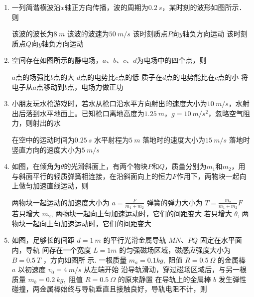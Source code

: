 \begin{enumerate}
\item
一列简谐横波沿$ x $轴正方向传播，波的周期为$ 0.2 \ s $，某时刻的波形如图所示．则  
\begin{figure}[h!]
\centering

\end{figure}

\fourchoices
{该波的波长为$ 8 \ m $}
{该波的波速为$ 50 \ m /s $}
{该时刻质点$ P $向$ y $轴负方向运动}
{该时刻质点$ Q $向$ y $轴负方向运动}


\item 
空间存在如图所示的静电场，$ a $、$ b $、$ c $、$ d $为电场中的四个点，则  
\begin{figure}[h!]
\centering

\end{figure}

\fourchoices
{$ a $点的场强比$ b $点的大}
{$ d $点的电势比$ c $点的低}
{质子在$ d $点的电势能比在$ c $点的小}
{将电子从$ a $点移动到$ b $点，电场力做正功}




\item
小朋友玩水枪游戏时，若水从枪口沿水平方向射出的速度大小为$ 10 \ m /s $，水射出后落到水平地面上。已知枪口离地高度为$ 1.25 \ m $，$ g=10 \ m /s^{2} $，忽略空气阻力，则射出的水  

\fourchoices
{在空中的运动时间为$ 0.25 \ s $}
{水平射程为$ 5 \ m $}
{落地时的速度大小为$ 15 \ m /s $}
{落地时竖直方向的速度大小为$ 5 \ m /s $}




\item
如图，在倾角为$ \theta $的光滑斜面上，有两个物块$ P $和$ Q $，质量分别为$ m_{1} $和$ m_{2} $，用与斜面平行的轻质弹簧相连接，在沿斜面向上的恒力$ F $作用下，两物块一起向上做匀加速直线运动，则  
\begin{figure}[h!]
\centering

\end{figure}

\fourchoices
{两物块一起运动的加速度大小为 $a=\frac{F}{m_{1}+m_{2}}$}
{弹簧的弹力大小为 $T=\frac{m_{2}}{m_{1}+m_{2}} F$}
{若只增大 $m_{2}$, 两物块一起向上匀加速运动时，它们的间距变大}
{若只增大 $\theta$, 两物块一起向上匀加速运动时，它们的间距变大}








\item
如图，足够长的间距 $d=1 \ m$ 的平行光滑金属导轨 $M N $、$ P Q$ 固定在水平面内，导轨 间存在一个宽度 $L=1 m$ 的匀强磁场区域，磁感应强度大小为 $B=0.5 \ T $ ，方向如图所
示. 一根质量 $m_{a}=0.1 kg,$ 阻值 $R=0.5 \ \Omega$ 的金属棒 $a$ 以初速度 $v_{0}=4 \ m/s$ 从左端开始
沿导轨滑动，穿过磁场区域后，与另一根质量 $m_{b}=0.2 \ kg,$ 阻值 $R=0.5 \ \Omega$ 的原来静置
在导轨上的金属棒 $b$ 发生弹性碰撞，两金属棒始终与导轨垂直且接触良好，导轨电阻不计，则  
\begin{figure}[h!]
\centering

\end{figure}



\end{enumerate}
